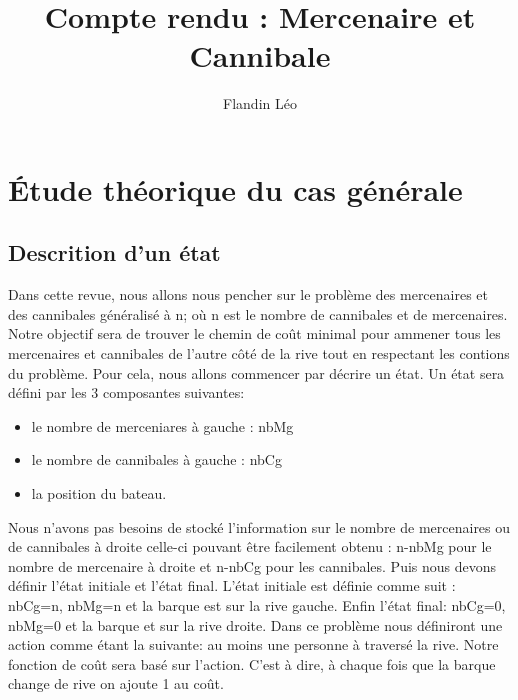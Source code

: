 \documentclass[a4paper, 12pt, french,oneside]{book}
\title{Compte rendu : Mercenaire et Cannibale}
\author{Flandin Léo}
\begin{document}
\maketitle
\tableofcontents
\frontmatter


\mainmatter
\chapter{Étude théorique du cas générale}
\section{Descrition d'un état}
Dans cette revue, nous allons nous pencher sur le problème des mercenaires et des cannibales généralisé à n; où n est le nombre de cannibales et de mercenaires. Notre objectif sera de trouver le chemin de coût minimal pour ammener tous les mercenaires et cannibales de l'autre côté de la rive tout en respectant les contions du problème. Pour cela, nous allons commencer par décrire un état. Un état sera défini par les 3 composantes suivantes:
\begin{itemize}
    \item le nombre de merceniares à gauche : nbMg
    \item le nombre de cannibales à gauche : nbCg
    \item la position du bateau.
\end{itemize}
Nous n'avons pas besoins de stocké l'information sur le nombre de mercenaires ou de cannibales à droite celle-ci pouvant être facilement obtenu : n-nbMg pour le nombre de mercenaire à droite et n-nbCg pour les cannibales. Puis nous devons définir l'état initiale et l'état final. L'état initiale est définie comme suit : nbCg=n, nbMg=n et la barque est sur la rive gauche. Enfin l'état final: nbCg=0, nbMg=0 et la barque et sur la rive droite. Dans ce problème nous définiront une action comme étant la suivante: au moins une personne à traversé la rive. Notre fonction de coût sera basé sur l'action. C'est à dire, à chaque fois que la barque change de rive on ajoute 1 au coût.
\end{document}
